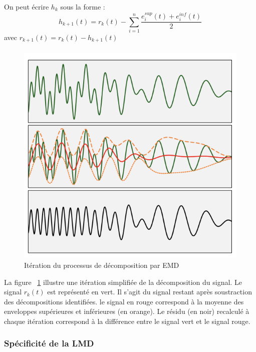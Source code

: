 On peut écrire $h_k$ sous la forme :
\begin{equation}
    h_{k+1}(t) = r_k(t)  - \sum_{i=1}^{n} \frac{e^{sup}_i(t) + e^{inf}_i(t)}{2}
\end{equation}
 avec $r_{k+1}(t)=r_k(t)-h_{k+1}(t)$
 \paragraph{}
 
\begin{figure}[!h]
    \begin{center}
        \includegraphics[scale=0.8]{rapport/images/Ch3_EMD.png}
    \end{center}
    \caption{Itération du processus de décomposition par EMD \cite{NAM}}
    \label{fig:EMD}
\end{figure}

La figure ~\ref{fig:EMD} illustre une itération simplifiée de la décomposition du signal. Le signal $r_k(t)$ est représenté en vert. Il s'agit du signal restant après soustraction des décompositions identifiées. le signal en rouge correspond à la moyenne des enveloppes supérieures et inférieures (en orange). Le résidu (en noir) recalculé à chaque itération correspond à la différence entre le signal vert et le signal rouge.


\subsubsection{Spécificité de la LMD}
